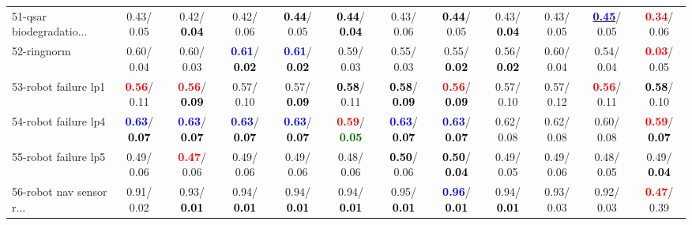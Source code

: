 \begin{table}[h]
\begin{center}
{\begin{tabular}{lc|c|c|c|c|c|c|c|c|c|c}
51-qsar biodegradatio... &   0.43/  0.05 &   0.42/\textcolor{black}{\textbf{  0.04}} &   0.42/  0.06 & \textcolor{black}{\textbf{  0.44}}/  0.05 & \textcolor{black}{\textbf{  0.44}}/\textcolor{black}{\textbf{  0.04}} &   0.43/  0.06 & \textcolor{black}{\textbf{  0.44}}/  0.05 &   0.43/\textcolor{black}{\textbf{  0.04}} &   0.43/  0.05 & \underline{\textcolor{blue}{\textbf{  0.45}}}/  0.05 & \textcolor{red}{\textbf{  0.34}}/  0.06 \\
52-ringnorm &   0.60/  0.04 &   0.60/  0.03 & \textcolor{blue}{\textbf{  0.61}}/\textcolor{black}{\textbf{  0.02}} & \textcolor{blue}{\textbf{  0.61}}/\textcolor{black}{\textbf{  0.02}} &   0.59/  0.03 &   0.55/  0.03 &   0.55/\textcolor{black}{\textbf{  0.02}} &   0.56/\textcolor{black}{\textbf{  0.02}} &   0.60/  0.04 &   0.54/  0.04 & \textcolor{red}{\textbf{  0.03}}/  0.05 \\
53-robot failure lp1 & \textcolor{red}{\textbf{  0.56}}/  0.11 & \textcolor{red}{\textbf{  0.56}}/\textcolor{black}{\textbf{  0.09}} &   0.57/  0.10 &   0.57/\textcolor{black}{\textbf{  0.09}} & \textcolor{black}{\textbf{  0.58}}/  0.11 & \textcolor{black}{\textbf{  0.58}}/\textcolor{black}{\textbf{  0.09}} & \textcolor{red}{\textbf{  0.56}}/\textcolor{black}{\textbf{  0.09}} &   0.57/  0.10 &   0.57/  0.12 & \textcolor{red}{\textbf{  0.56}}/  0.11 & \textcolor{black}{\textbf{  0.58}}/  0.10 \\ \hline
54-robot failure lp4 & \textcolor{blue}{\textbf{  0.63}}/\textcolor{black}{\textbf{  0.07}} & \textcolor{blue}{\textbf{  0.63}}/\textcolor{black}{\textbf{  0.07}} & \textcolor{blue}{\textbf{  0.63}}/\textcolor{black}{\textbf{  0.07}} & \textcolor{blue}{\textbf{  0.63}}/\textcolor{black}{\textbf{  0.07}} & \textcolor{red}{\textbf{  0.59}}/\textcolor{darkgreen}{\textbf{  0.05}} & \textcolor{blue}{\textbf{  0.63}}/\textcolor{black}{\textbf{  0.07}} & \textcolor{blue}{\textbf{  0.63}}/\textcolor{black}{\textbf{  0.07}} &   0.62/  0.08 &   0.62/  0.08 &   0.60/  0.08 & \textcolor{red}{\textbf{  0.59}}/\textcolor{black}{\textbf{  0.07}} \\
55-robot failure lp5 &   0.49/  0.06 & \textcolor{red}{\textbf{  0.47}}/  0.06 &   0.49/  0.06 &   0.49/  0.06 &   0.48/  0.06 & \textcolor{black}{\textbf{  0.50}}/  0.06 & \textcolor{black}{\textbf{  0.50}}/\textcolor{black}{\textbf{  0.04}} &   0.49/  0.05 &   0.49/  0.06 &   0.48/  0.05 &   0.49/\textcolor{black}{\textbf{  0.04}} \\
56-robot nav sensor r... &   0.91/  0.02 &   0.93/\textcolor{black}{\textbf{  0.01}} &   0.94/\textcolor{black}{\textbf{  0.01}} &   0.94/\textcolor{black}{\textbf{  0.01}} &   0.94/\textcolor{black}{\textbf{  0.01}} &   0.95/\textcolor{black}{\textbf{  0.01}} & \textcolor{blue}{\textbf{  0.96}}/\textcolor{black}{\textbf{  0.01}} &   0.94/\textcolor{black}{\textbf{  0.01}} &   0.93/  0.03 &   0.92/  0.03 & \textcolor{red}{\textbf{  0.47}}/  0.39 \\

\end{tabular}}
\end{center}
\end{table}

